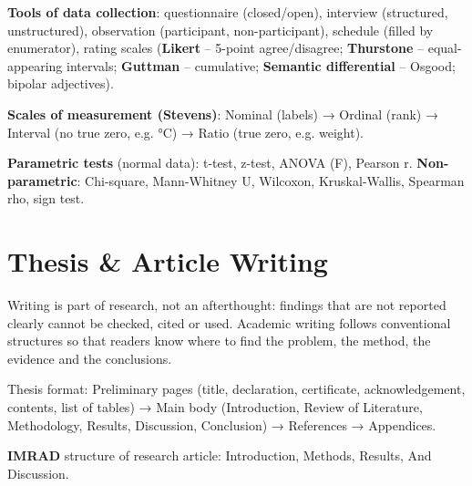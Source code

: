 

\textbf{Tools of data collection}: questionnaire (closed/open), interview (structured, unstructured), observation
(participant, non-participant), schedule (filled by enumerator), rating scales (\textbf{Likert} -- 5-point agree/disagree;
\textbf{Thurstone} -- equal-appearing intervals; \textbf{Guttman} -- cumulative; \textbf{Semantic differential} -- Osgood; bipolar adjectives).

\textbf{Scales of measurement (Stevens)}: Nominal (labels) → Ordinal (rank) → Interval (no true zero, e.g. °C) → Ratio (true zero, e.g. weight).

\textbf{Parametric tests} (normal data): t-test, z-test, ANOVA (F), Pearson r.
\textbf{Non-parametric}: Chi-square, Mann-Whitney U, Wilcoxon, Kruskal-Wallis, Spearman rho, sign test.

\needspace{155pt}

\hypertarget{p1-02--6-thesis--article-writing}{%
\section{Thesis \& Article Writing}\label{p1-02--6-thesis--article-writing}}

Writing is part of research, not an afterthought: findings that are not reported clearly cannot be checked,
cited or used. Academic writing follows conventional structures so that readers know where to find the
problem, the method, the evidence and the conclusions.

Thesis format: Preliminary pages (title, declaration, certificate, acknowledgement, contents, list of tables) →
Main body (Introduction, Review of Literature, Methodology, Results, Discussion, Conclusion) → References → Appendices.

\textbf{IMRAD} structure of research article: Introduction, Methods, Results, And Discussion.

\begingroup\small


